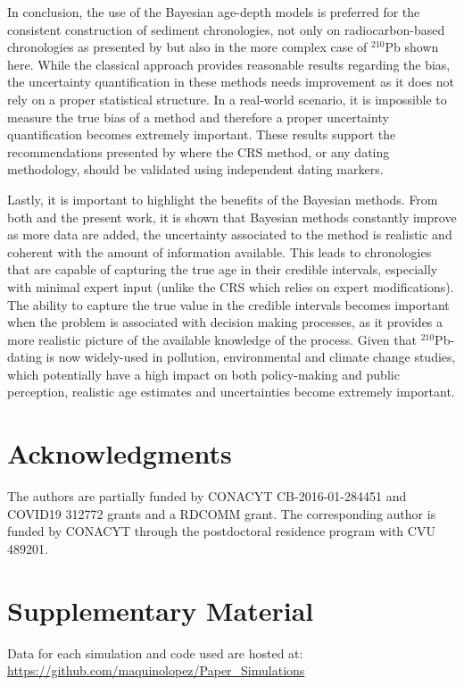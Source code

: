 \documentclass [10pt] {article}
\begin{document}
In conclusion, the use of the Bayesian age-depth models is preferred for the consistent construction of sediment chronologies, not only on radiocarbon-based chronologies as presented by \citet{Blaauw2018} but also in the more complex case of $^{210}$Pb shown here.
While the classical approach provides reasonable results regarding the bias, the uncertainty quantification in these methods needs improvement as it does not rely on a proper statistical structure. 
In a real-world scenario, it is impossible to measure the true bias of a method and therefore a proper uncertainty quantification becomes extremely important.
These results support the recommendations presented by \citet{Smith2001,Barsanti2020} where the CRS method, or any dating methodology, should be validated using independent dating markers. 

Lastly, it is important to highlight the benefits of the Bayesian methods.
From both \citet{Blaauw2018} and the present work, it is shown that Bayesian methods constantly improve as more data are added, the uncertainty associated to the method is realistic and coherent with the amount of information available. 
This leads to chronologies that are capable of capturing the true age in their credible intervals, especially with minimal expert input (unlike the CRS which relies on expert modifications). 
The ability to capture the true value in the credible intervals becomes important when the problem is associated with decision making processes, as it provides a more realistic picture of the available knowledge of the process. 
Given that $^{210}$Pb-dating is now widely-used in pollution, environmental and climate change studies, which potentially have a high impact on both policy-making and public perception, realistic age estimates and uncertainties become extremely important.

\section{Acknowledgments}

The authors are partially funded by CONACYT CB-2016-01-284451 and COVID19 312772 grants and a RDCOMM grant.
The corresponding author is funded by CONACYT through the postdoctoral residence program with CVU  489201.




\newpage




\section{Supplementary Material}
\label{sec:supp_mat}
Data for each simulation and code used are hosted at: \url{https://github.com/maquinolopez/Paper_Simulations}
\end{document}
